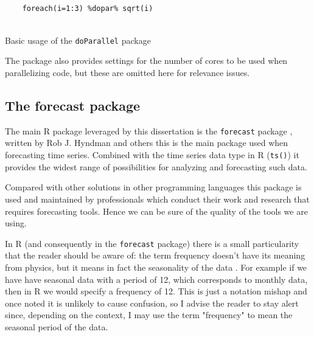 \documentclass[12pt,a4paper,titlepage]{report}
\begin{document}
\begin{listing}[h]
    \begin{verbatim}
    
    foreach(i=1:3) %dopar% sqrt(i)    
    
    \end{verbatim}
    
    \caption{Basic usage of the \texttt{doParallel} package}
    \label{exampleparallelcode}
\end{listing}

The package also provides settings for the number of cores to be used when parallelizing code, but these are omitted here for relevance issues.

\subsection{The forecast package} \label{forecastpackagesection}

The main R package leveraged by this dissertation is the \texttt{forecast} package \cite{rforecastpackage}, written by Rob J. Hyndman and others \cite{forecastpackagearticle} this is the main package used when forecasting time series.
Combined with the time series data type in R (\texttt{ts()}) it provides the widest range of possibilities for analyzing and forecasting such data.

Compared with other solutions in other programming languages this package is used and maintained by professionals which conduct their work and research that requires forecasting tools. Hence we can be sure of the quality of the tools we are using.

In R (and consequently in the \texttt{forecast} package) there is a small particularity that the reader should be aware of: the term frequency doesn't have its meaning from physics, but it means in fact the seasonality of the data \cite{hyndmanseasonalperiods}.
For example if we have have seasonal data with a period of 12, which corresponds to monthly data, then in R we would specify a frequency of 12.
This is just a notation mishap and once noted it is unlikely to cause confusion, so I advise the reader to stay alert since, depending on the context, I may use the term "frequency" to mean the seasonal period of the data.
\end{document}
